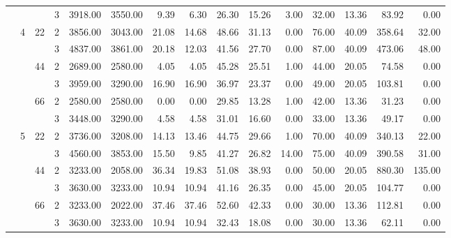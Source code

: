 \begin{tabular}{llllrrrrrrrrrrr}
               &   &    & 3 &  3918.00 &   3550.00 &  9.39 &    6.30 &   26.30 &   15.26 &    3.00 &   32.00 &   13.36 &   83.92 &     0.00 \\
\cline{2-15}
\cline{3-15}
               & \multirow{6}{*}{4} & \multirow{2}{*}{22} & 2 &  3856.00 &   3043.00 & 21.08 &   14.68 &   48.66 &   31.13 &    0.00 &   76.00 &   40.09 &  358.64 &    32.00 \\
               &   &    & 3 &  4837.00 &   3861.00 & 20.18 &   12.03 &   41.56 &   27.70 &    0.00 &   87.00 &   40.09 &  473.06 &    48.00 \\
\cline{3-15}
               &   & \multirow{2}{*}{44} & 2 &  2689.00 &   2580.00 &  4.05 &    4.05 &   45.28 &   25.51 &    1.00 &   44.00 &   20.05 &   74.58 &     0.00 \\
               &   &    & 3 &  3959.00 &   3290.00 & 16.90 &   16.90 &   36.97 &   23.37 &    0.00 &   49.00 &   20.05 &  103.81 &     0.00 \\
\cline{3-15}
               &   & \multirow{2}{*}{66} & 2 &  2580.00 &   2580.00 &  0.00 &    0.00 &   29.85 &   13.28 &    1.00 &   42.00 &   13.36 &   31.23 &     0.00 \\
               &   &    & 3 &  3448.00 &   3290.00 &  4.58 &    4.58 &   31.01 &   16.60 &    0.00 &   33.00 &   13.36 &   49.17 &     0.00 \\
\cline{2-15}
\cline{3-15}
               & \multirow{6}{*}{5} & \multirow{2}{*}{22} & 2 &  3736.00 &   3208.00 & 14.13 &   13.46 &   44.75 &   29.66 &    1.00 &   70.00 &   40.09 &  340.13 &    22.00 \\
               &   &    & 3 &  4560.00 &   3853.00 & 15.50 &    9.85 &   41.27 &   26.82 &   14.00 &   75.00 &   40.09 &  390.58 &    31.00 \\
\cline{3-15}
               &   & \multirow{2}{*}{44} & 2 &  3233.00 &   2058.00 & 36.34 &   19.83 &   51.08 &   38.93 &    0.00 &   50.00 &   20.05 &  880.30 &   135.00 \\
               &   &    & 3 &  3630.00 &   3233.00 & 10.94 &   10.94 &   41.16 &   26.35 &    0.00 &   45.00 &   20.05 &  104.77 &     0.00 \\
\cline{3-15}
               &   & \multirow{2}{*}{66} & 2 &  3233.00 &   2022.00 & 37.46 &   37.46 &   52.60 &   42.33 &    0.00 &   30.00 &   13.36 &  112.81 &     0.00 \\
               &   &    & 3 &  3630.00 &   3233.00 & 10.94 &   10.94 &   32.43 &   18.08 &    0.00 &   30.00 &   13.36 &   62.11 &     0.00 \\

\end{tabular}
